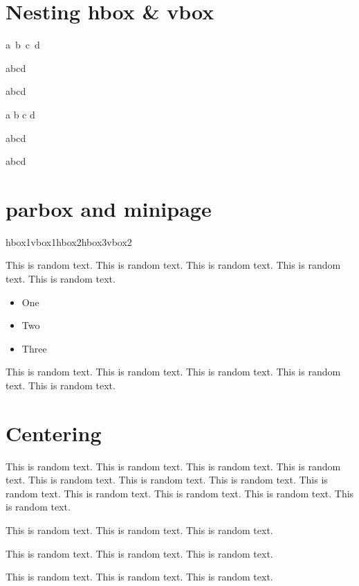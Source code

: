 \documentclass{article}
\begin{document}
\section{Nesting hbox \& vbox}
\hbox{a b c d}

\hbox{\hbox{a}\hbox{b}\hbox{c}\hbox{d}}

\hbox{\vbox{a}\vbox{b}\vbox{c}\vbox{d}}

\vbox{a b c d}

\vbox{\hbox{a}\hbox{b}\hbox{c}\hbox{d}}

\vbox{\vbox{a}\vbox{b}\vbox{c}\vbox{d}}

\section{parbox and minipage}

\parbox{2in}{%
  \hbox{hbox1}\vbox{vbox1}\hbox{hbox2}\hbox{hbox3}\vbox{vbox2}}

\begin{minipage}{2in}
This is random text. This is random text.
This is random text. This is random text. This is random text.
\begin{itemize}
\item One
\item Two
\item Three
\end{itemize}
This is random text. This is random text.
This is random text. This is random text. This is random text.
\end{minipage}


\section{Centering}

\begin{center}
This is random text. This is random text. This is random text.
This is random text. This is random text. This is random text.
This is random text. This is random text. This is random text.
This is random text. This is random text. This is random text.
\end{center}

\begin{center}
This is random text. This is random text. This is random text.

This is random text. This is random text. This is random text.

This is random text. This is random text. This is random text.
\end{center}
\end{document}
